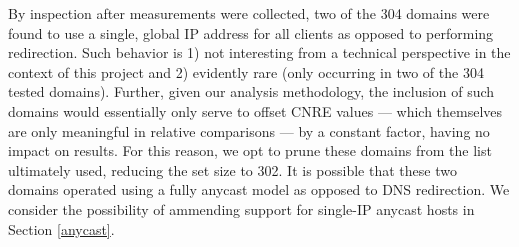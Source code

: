 By inspection after measurements were collected, two of
the 304 domains were found to use a single, global IP address for all clients as
opposed to performing redirection. Such behavior is 1) not interesting from a
technical perspective in the context of this project and 2) evidently rare (only
occurring in two of the 304 tested domains). Further, given our analysis
methodology, the inclusion of such domains would essentially only serve to
offset CNRE values --- which themselves are only meaningful in relative
comparisons --- by a constant factor, having no impact on results. For this
reason, we opt to prune these domains from the list ultimately used, reducing the
set size to 302. It is possible that these two domains operated using a fully
anycast model as opposed to DNS redirection. We consider the
possibility of ammending support for single-IP anycast hosts in Section
\ref{anycast}.

